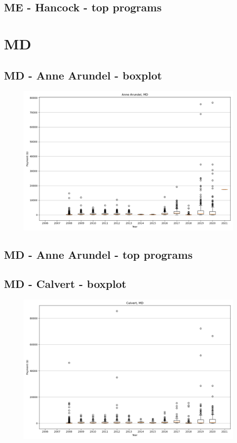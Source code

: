 \subsection*{ME - Hancock - top programs}

\newpage
\section*{MD}
\subsection*{MD - Anne Arundel - boxplot}
\begin{figure}[h]
\centering
\includegraphics[width=7in]{../output/boxplots/counties/Anne Arundel-MD_boxplot.png}
\end{figure}


\subsection*{MD - Anne Arundel - top programs}

\newpage
\subsection*{MD - Calvert - boxplot}
\begin{figure}[h]
\centering
\includegraphics[width=7in]{../output/boxplots/counties/Calvert-MD_boxplot.png}
\end{figure}


